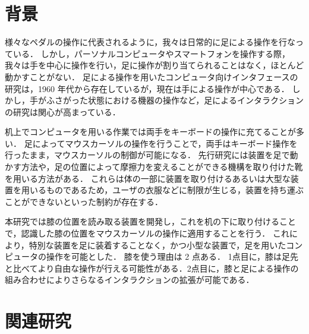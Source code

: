 \documentclass[submit, techrep]{ipsj}
\begin{document}
\section{背景}
様々なペダルの操作に代表されるように，我々は日常的に足による操作を行なっている．
しかし，パーソナルコンピュータやスマートフォンを操作する際，我々は手を中心に操作を行い，足に操作が割り当てられることはなく，ほとんど動かすことがない．
足による操作を用いたコンピュータ向けインタフェースの研究は，1960 年代から存在している\cite{1698228}が，現在は手による操作が中心である．
しかし，手がふさがった状態における機器の操作\cite{Fan:2017:ESF:3123021.3123043}など，足によるインタラクションの研究は関心が高まっている．\par
机上でコンピュータを用いる作業では両手をキーボードの操作に充てることが多い．
足によってマウスカーソルの操作を行うことで，両手はキーボード操作を行ったまま，マウスカーソルの制御が可能になる．
先行研究には装置を足で動かす方法\cite{Pearson:1986:MMD:22627.22392, Pearson:1988:EEP:57167.57169}や，足の位置によって摩擦力を変えることができる機構を取り付けた靴\cite{Horodniczy:2017:FHE:3025453.3025625}を用いる方法がある．
これらは体の一部に装置を取り付けるあるいは大型な装置を用いるものであるため，ユーザの衣服などに制限が生じる，装置を持ち運ぶことができないといった制約が存在する．\par
本研究では膝の位置を読み取る装置を開発し，これを机の下に取り付けることで，認識した膝の位置をマウスカーソルの操作に適用することを行う．
これにより，特別な装置を足に装着することなく，かつ小型な装置で，足を用いたコンピュータの操作を可能とした．
膝を使う理由は 2 点ある．
1点目に，膝は足先と比べてより自由な操作が行える可能性がある．2点目に，膝と足による操作の組み合わせによりさらなるインタラクションの拡張が可能である．

\section{関連研究}
\end{document}
